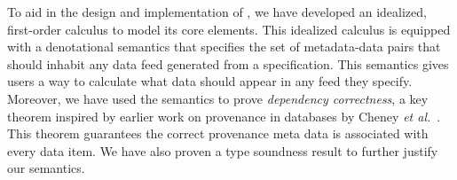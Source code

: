 

To aid in the design and implementation of \padsd{}, we have developed
an idealized, first-order calculus to model its core elements.  
This idealized calculus is equipped with a denotational
semantics that specifies the set of metadata-data pairs that should
inhabit any data feed generated from a specification.  This semantics
gives users a way to calculate what data should appear in any feed
they specify.  Moreover, we have used the
semantics to prove {\em dependency correctness}, a key theorem
inspired by earlier work on provenance in databases by 
Cheney {\em et al.}~\cite{cheney-dbpl07}.  This theorem
guarantees the correct provenance meta data is associated with
every data item.  We have also proven a type soundness result
to further justify our semantics.

